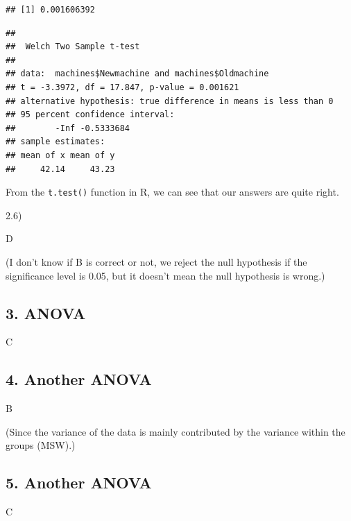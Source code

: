 \documentclass[
]{article}
\newenvironment{Shaded}{\begin{snugshade}}{\end{snugshade}}
\newcommand{\AttributeTok}[1]{\textcolor[rgb]{0.77,0.63,0.00}{#1}}
\newcommand{\FunctionTok}[1]{\textcolor[rgb]{0.00,0.00,0.00}{#1}}
\newcommand{\NormalTok}[1]{#1}
\newcommand{\SpecialCharTok}[1]{\textcolor[rgb]{0.00,0.00,0.00}{#1}}
\newcommand{\StringTok}[1]{\textcolor[rgb]{0.31,0.60,0.02}{#1}}
\begin{document}
\begin{verbatim}
## [1] 0.001606392
\end{verbatim}

\begin{Shaded}
\end{Shaded}

\begin{verbatim}
## 
##  Welch Two Sample t-test
## 
## data:  machines$Newmachine and machines$Oldmachine
## t = -3.3972, df = 17.847, p-value = 0.001621
## alternative hypothesis: true difference in means is less than 0
## 95 percent confidence interval:
##        -Inf -0.5333684
## sample estimates:
## mean of x mean of y 
##     42.14     43.23
\end{verbatim}

From the \texttt{t.test()} function in R, we can see that our answers
are quite right.

2.6)

D

(I don't know if B is correct or not, we reject the null hypothesis if
the significance level is 0.05, but it doesn't mean the null hypothesis
is wrong.)

\hypertarget{anova}{%
\subsection{3. ANOVA}\label{anova}}

C

\hypertarget{another-anova}{%
\subsection{4. Another ANOVA}\label{another-anova}}

B

(Since the variance of the data is mainly contributed by the variance
within the groups (MSW).)

\hypertarget{another-anova-1}{%
\subsection{5. Another ANOVA}\label{another-anova-1}}

C
\end{document}
